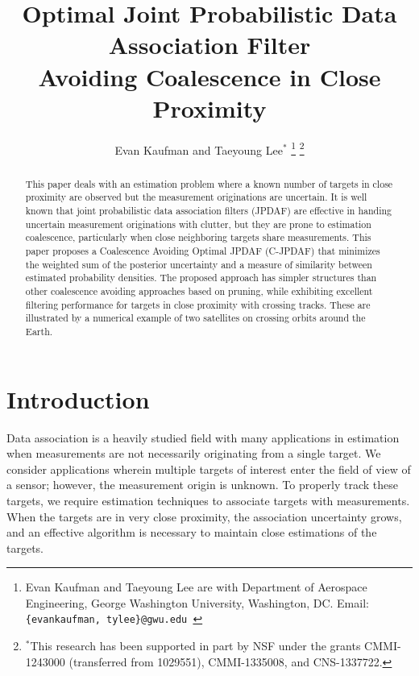 \documentclass[letterpaper, 10pt, conference]{ieeeconf}
\title{\LARGE \bf
Optimal Joint Probabilistic Data Association Filter\\ Avoiding Coalescence in Close Proximity }
\author{Evan Kaufman and Taeyoung Lee$^*$
 \thanks{Evan Kaufman and Taeyoung Lee are with Department of Aerospace Engineering, George Washington University, Washington, DC. Email: {\tt\footnotesize \{evankaufman, tylee\}@gwu.edu }}
\thanks{$^*$This research has been supported in part by NSF under the grants CMMI-1243000 (transferred from 1029551), CMMI-1335008, and CNS-1337722.}}
\begin{document}
\allowdisplaybreaks


\maketitle \thispagestyle{empty} \pagestyle{empty}

\begin{abstract}
This paper deals with an estimation problem where a known number of targets in close proximity are observed but the measurement originations are uncertain. It is well known that joint probabilistic data association filters (JPDAF) are effective in handing uncertain measurement originations with clutter, but they are prone to estimation coalescence, particularly when close neighboring targets share measurements. This paper proposes a Coalescence Avoiding Optimal JPDAF (C-JPDAF) that minimizes the weighted sum of the posterior uncertainty and a measure of similarity between estimated probability densities. The proposed approach has simpler structures than other coalescence avoiding approaches based on pruning, while exhibiting excellent filtering performance for targets in close proximity with crossing tracks. These are illustrated by a numerical example of two satellites on crossing orbits around the Earth.
\end{abstract}


\section{Introduction}

Data association is a heavily studied field with many applications in estimation when measurements are not necessarily originating from a single target.
We consider applications wherein multiple targets of interest enter the field of view of a sensor; however, the measurement origin is unknown.
To properly track these targets, we require estimation techniques to associate targets with measurements.
When the targets are in very close proximity, the association uncertainty grows, and an effective algorithm is necessary to maintain close estimations of the targets.
\end{document}

